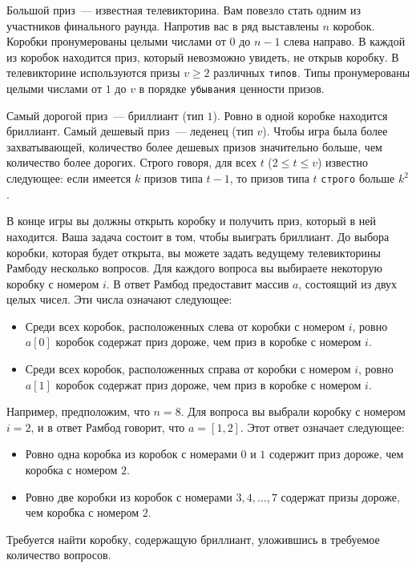 Большой приз~--- известная телевикторина. Вам повезло стать одним из участников
финального раунда. Напротив вас в ряд выставлены $n$ коробок. Коробки пронумерованы
целыми числами от $0$ до $n - 1$ слева направо. В каждой из коробок находится приз, который
невозможно увидеть, не открыв коробку. В телевикторине используются призы $v \geq 2$ различных \texttt{типов}. Типы пронумерованы целыми числами от $1$ до $v$ в порядке \texttt{убывания} ценности призов.

Самый дорогой приз~--- бриллиант (тип $1$). Ровно в одной коробке находится бриллиант.
Самый дешевый приз~--- леденец (тип $v$). Чтобы игра была более захватывающей, количество
более дешевых призов значительно больше, чем количество более дорогих. Строго говоря,
для всех $t$ ($2 \leq t \leq v$) известно следующее: если имеется $k$ призов типа $t - 1$, то призов типа $t$ \texttt{строго} больше $k^2$.

В конце игры вы должны открыть коробку и получить приз, который в ней находится. Ваша
задача состоит в том, чтобы выиграть бриллиант. До выбора коробки, которая будет открыта,
вы можете задать ведущему телевикторины Рамбоду несколько вопросов. Для каждого
вопроса вы выбираете некоторую коробку с номером $i$. В ответ Рамбод предоставит массив $a$, состоящий из двух целых чисел. Эти числа означают следующее:

\begin{itemize}
\item Среди всех коробок, расположенных слева от коробки с номером $i$, ровно $a[0]$ коробок содержат приз дороже, чем приз в коробке с номером $i$.
\item Среди всех коробок, расположенных справа от коробки с номером $i$, ровно $a[1]$ коробок содержат приз дороже, чем приз в коробке с номером $i$.
\end{itemize}

Например, предположим, что $n = 8$. Для вопроса вы выбрали коробку с номером $i = 2$, и в
ответ Рамбод говорит, что $a = [1, 2]$. Этот ответ означает следующее:

\begin{itemize}
\item Ровно одна коробка из коробок с номерами $0$ и $1$ содержит приз дороже, чем коробка с
номером $2$.
\item Ровно две коробки из коробок с номерами $3, 4, \ldots, 7$ содержат призы дороже, чем коробка с номером $2$.
\end{itemize}

Требуется найти коробку, содержащую бриллиант, уложившись в требуемое количество
вопросов.

